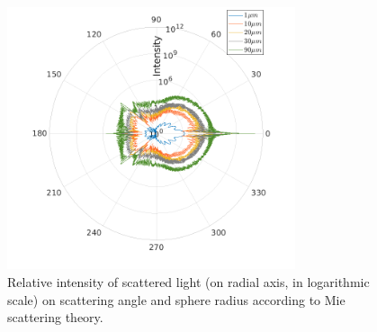 \documentclass[../main.tex]{subfiles}
\begin{document}
\begin{figure}
\centering
\noindent \includegraphics[width=20pc]{gfx/I_vs_angle_multiple.png}
\caption{Relative intensity of scattered light (on radial axis, in logarithmic scale) on scattering angle and sphere radius according to Mie scattering theory.}
\label{fig:ch2_07}
\end{figure}
\end{document}
